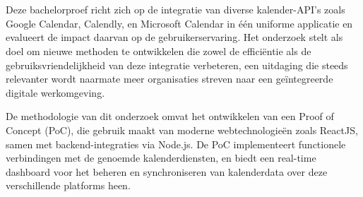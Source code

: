 
%
%
%
%
%

%



\chapter*{}

Deze bachelorproef richt zich op de integratie van diverse kalender-API's zoals Google Calendar, Calendly, en Microsoft Calendar in één uniforme applicatie en evalueert de impact daarvan op de gebruikerservaring. Het onderzoek stelt als doel om nieuwe methoden te ontwikkelen die zowel de efficiëntie als de gebruiksvriendelijkheid van deze integratie verbeteren, een uitdaging die steeds relevanter wordt naarmate meer organisaties streven naar een geïntegreerde digitale werkomgeving.

De methodologie van dit onderzoek omvat het ontwikkelen van een Proof of Concept (PoC), die gebruik maakt van moderne webtechnologieën zoals ReactJS, samen met backend-integraties via Node.js. De PoC implementeert functionele verbindingen met de genoemde kalenderdiensten, en biedt een real-time dashboard voor het beheren en synchroniseren van kalenderdata over deze verschillende platforms heen.

